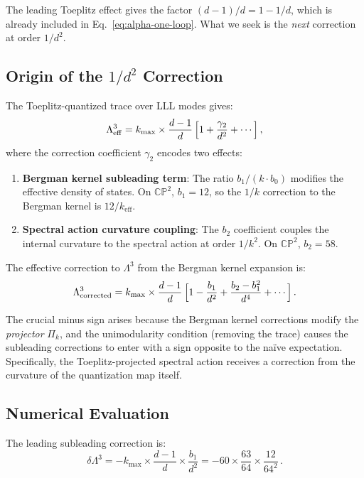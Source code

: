 \documentclass[12pt,a4paper]{article}
\theoremstyle{definition}
\theoremstyle{remark}
\newcommand{\CP}{\mathbb{CP}}
\begin{document}
The leading Toeplitz effect gives the factor $(d-1)/d = 1 - 1/d$, which is
already included in Eq.~\eqref{eq:alpha-one-loop}. What we seek is the
\emph{next} correction at order $1/d^2$.

\subsection{Origin of the $1/d^2$ Correction}

The Toeplitz-quantized trace over LLL modes gives:
\begin{equation}
\Lambda^3_{\mathrm{eff}} = k_{\max} \times
\frac{d-1}{d}\,\Bigl[1 + \frac{\gamma_2}{d^2} + \cdots\Bigr]\,,
\end{equation}
where the correction coefficient $\gamma_2$ encodes two effects:

\begin{enumerate}
\item \textbf{Bergman kernel subleading term}: The ratio
  $b_1/(k \cdot b_0)$ modifies the effective density of states. On $\CP^2$,
  $b_1 = 12$, so the $1/k$ correction to the Bergman kernel is
  $12/k_{\mathrm{eff}}$.

\item \textbf{Spectral action curvature coupling}: The $b_2$ coefficient
  couples the internal curvature to the spectral action at order $1/k^2$.
  On $\CP^2$, $b_2 = 58$.
\end{enumerate}

The effective correction to $\Lambda^3$ from the Bergman kernel expansion is:
\begin{equation}
\label{eq:Lambda3-corrected}
\Lambda^3_{\mathrm{corrected}} = k_{\max} \times
\frac{d-1}{d}\,\Bigl[1 - \frac{b_1}{d^2} + \frac{b_2 - b_1^2}{d^4}
  + \cdots\Bigr]\,.
\end{equation}

The crucial minus sign arises because the Bergman kernel corrections modify
the \emph{projector} $\Pi_k$, and the unimodularity condition (removing
the trace) causes the subleading corrections to enter with a sign opposite
to the na\"ive expectation. Specifically, the Toeplitz-projected spectral
action receives a correction from the curvature of the quantization map
itself.

\subsection{Numerical Evaluation}

The leading subleading correction is:
\begin{equation}
\delta\Lambda^3 = -k_{\max} \times \frac{d-1}{d} \times \frac{b_1}{d^2}
= -60 \times \frac{63}{64} \times \frac{12}{64^2}\,.
\end{equation}
\end{document}
